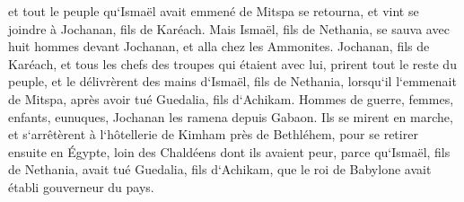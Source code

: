 \verse et tout le peuple qu`Ismaël avait emmené de Mitspa se retourna, et vint se joindre à Jochanan, fils de Karéach. 
\verse Mais Ismaël, fils de Nethania, se sauva avec huit hommes devant Jochanan, et alla chez les Ammonites. 
\verse Jochanan, fils de Karéach, et tous les chefs des troupes qui étaient avec lui, prirent tout le reste du peuple, et le délivrèrent des mains d`Ismaël, fils de Nethania, lorsqu`il l`emmenait de Mitspa, après avoir tué Guedalia, fils d`Achikam. Hommes de guerre, femmes, enfants, eunuques, Jochanan les ramena depuis Gabaon. 
\verse Ils se mirent en marche, et s`arrêtèrent à l`hôtellerie de Kimham près de Bethléhem, pour se retirer ensuite en Égypte, 
\verse loin des Chaldéens dont ils avaient peur, parce qu`Ismaël, fils de Nethania, avait tué Guedalia, fils d`Achikam, que le roi de Babylone avait établi gouverneur du pays. 

